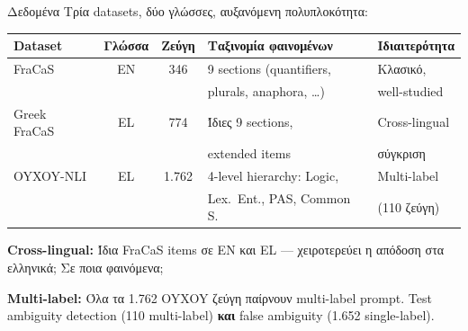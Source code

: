 \documentclass[aspectratio=169,10pt]{beamer}
\begin{document}
\begin{frame}{Δεδομένα}
	Τρία datasets, δύο γλώσσες, αυξανόμενη πολυπλοκότητα:

	\vspace{0.3cm}
	\begin{center}
		\small
		\begin{tabular}{l c c l l}
			\toprule
			\textbf{Dataset} & \textbf{Γλώσσα} & \textbf{Ζεύγη} & \textbf{Ταξινομία φαινομένων} & \textbf{Ιδιαιτερότητα} \\
			\midrule
			FraCaS & EN & 346 & 9 sections (quantifiers, & Κλασικό, \\
			& & & plurals, anaphora, \ldots) & well-studied \\[4pt]
			Greek FraCaS & EL & 774 & Ίδιες 9 sections, & Cross-lingual \\
			& & & extended items & σύγκριση \\[4pt]
			OYXOY-NLI & EL & 1.762 & 4-level hierarchy: Logic, & Multi-label \\
			& & & Lex.\ Ent., PAS, Common S. & (110 ζεύγη) \\
			\bottomrule
		\end{tabular}
	\end{center}

	\vspace{0.3cm}
	\textbf{Cross-lingual:} Ίδια FraCaS items σε EN και EL --- χειροτερεύει η απόδοση στα ελληνικά; Σε ποια φαινόμενα;

	\vspace{0.2cm}
	\textbf{Multi-label:} Όλα τα 1.762 OYXOY ζεύγη παίρνουν multi-label prompt. Test ambiguity detection (110 multi-label) \textbf{και} false ambiguity (1.652 single-label).
\end{frame}
\end{document}
